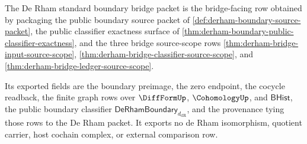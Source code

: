 \begin{definition}
\label{def:derham-standard-boundary-bridge-packet}
The De Rham standard boundary bridge packet is the bridge-facing row obtained
by packaging the public boundary source packet of
\autoref{def:derham-boundary-source-packet}, the public classifier exactness
surface of \autoref{thm:derham-boundary-public-classifier-exactness}, and the
three bridge source-scope rows
\autoref{thm:derham-bridge-input-source-scope},
\autoref{thm:derham-bridge-classifier-source-scope}, and
\autoref{thm:derham-bridge-ledger-source-scope}.

Its exported fields are the boundary preimage, the zero endpoint, the cocycle
readback, the finite graph rows over $\DiffFormUp$, $\CohomologyUp$, and
$\mathsf{BHist}$, the public boundary classifier
$\mathsf{DeRhamBoundary}_{d_{\mathrm{dR}}}$, and the provenance tying those
rows to the De Rham packet. It exports no de Rham isomorphism, quotient
carrier, host cochain complex, or external comparison row.
\end{definition}

